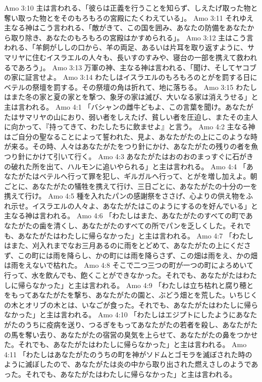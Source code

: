 Amo 3:10  主は言われる、「彼らは正義を行うことを知らず、しえたげ取った物と奪い取った物とをそのもろもろの宮殿にたくわえている」。
Amo 3:11  それゆえ主なる神はこう言われる、「敵がきて、この国を囲み、あなたの防備をあなたから取り除き、あなたのもろもろの宮殿はかすめられる」。
Amo 3:12  主はこう言われる、「羊飼がししの口から、羊の両足、あるいは片耳を取り返すように、サマリヤに住むイスラエルの人々も、長いすのすみや、寝台の一部を携えて救われるであろう」。
Amo 3:13  万軍の神、主なる神は言われる、「聞け、そしてヤコブの家に証言せよ。
Amo 3:14  わたしはイスラエルのもろもろのとがを罰する日にベテルの祭壇を罰する。その祭壇の角は折れて、地に落ちる。
Amo 3:15  わたしはまた冬の家と夏の家とを撃つ、象牙の家は滅び、大いなる家は消えうせる」と主は言われる。
Amo 4:1  「バシャンの雌牛どもよ、この言葉を聞け。あなたがたはサマリヤの山におり、弱い者をしえたげ、貧しい者を圧迫し、またその主人に向かって、『持ってきて、わたしたちに飲ませよ』と言う。
Amo 4:2  主なる神はご自分の聖なることによって誓われた、見よ、あなたがたの上にこのような時が来る。その時、人々はあなたがたをつり針にかけ、あなたがたの残りの者を魚つり針にかけて引いて行く。
Amo 4:3  あなたがたはおのおのまっすぐに石がきの破れた所を出て、ハルモンに追いやられる」と主は言われる。
Amo 4:4  「あなたがたはベテルへ行って罪を犯し、ギルガルへ行って、とがを増し加えよ。朝ごとに、あなたがたの犠牲を携えて行け、三日ごとに、あなたがたの十分の一を携えて行け。
Amo 4:5  種を入れたパンの感謝祭をささげ、心よりの供え物をふれ示せ。イスラエルの人々よ、あなたがたはこのようにするのを好んでいる」と主なる神は言われる。
Amo 4:6  「わたしはまた、あなたがたのすべての町であなたがたの歯を清くし、あなたがたのすべての所でパンを乏しくした。それでも、あなたがたはわたしに帰らなかった」と主は言われる。
Amo 4:7  「わたしはまた、刈入れまでなお三月あるのに雨をとどめて、あなたがたの上にくださず、この町には雨を降らし、かの町には雨を降らさず、この畑は雨をえ、かの畑は雨をえないで枯れた。
Amo 4:8  そこで二つ三つの町が一つの町によろめいて行って、水を飲んでも、飽くことができなかった。それでも、あなたがたはわたしに帰らなかった」と主は言われる。
Amo 4:9  「わたしは立ち枯れと腐り穂とをもってあなたがたを撃ち、あなたがたの園と、ぶどう畑とを荒した。いちじくの木とオリブの木とは、いなごが食った。それでも、あなたがたはわたしに帰らなかった」と主は言われる。
Amo 4:10  「わたしはエジプトにしたようにあなたがたのうちに疫病を送り、つるぎをもってあなたがたの若者を殺し、あなたがたの馬を奪い去り、あなたがたの宿営の臭気を上らせて、あなたがたの鼻をつかせた。それでも、あなたがたはわたしに帰らなかった」と主は言われる。
Amo 4:11  「わたしはあなたがたのうちの町を神がソドムとゴモラを滅ぼされた時のように滅ぼしたので、あなたがたは炎の中から取り出された燃えさしのようであった。それでも、あなたがたはわたしに帰らなかった」と主は言われる。
